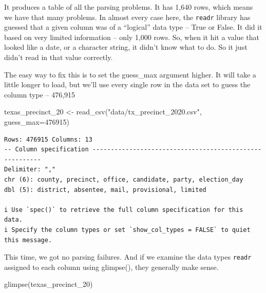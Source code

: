 \documentclass[
  letterpaper,
  DIV=11,
  numbers=noendperiod]{scrreprt}
\newenvironment{Shaded}{\begin{snugshade}}{\end{snugshade}}
\newcommand{\AttributeTok}[1]{\textcolor[rgb]{0.40,0.45,0.13}{#1}}
\newcommand{\DecValTok}[1]{\textcolor[rgb]{0.68,0.00,0.00}{#1}}
\newcommand{\FunctionTok}[1]{\textcolor[rgb]{0.28,0.35,0.67}{#1}}
\newcommand{\NormalTok}[1]{\textcolor[rgb]{0.00,0.23,0.31}{#1}}
\newcommand{\OtherTok}[1]{\textcolor[rgb]{0.00,0.23,0.31}{#1}}
\newcommand{\StringTok}[1]{\textcolor[rgb]{0.13,0.47,0.30}{#1}}
\begin{document}
It produces a table of all the parsing problems. It has 1,640 rows,
which means we have that many problems. In almost every case here, the
\texttt{readr} library has guessed that a given column was of a
``logical'' data type -- True or False. It did it based on very limited
information -- only 1,000 rows. So, when it hit a value that looked like
a date, or a character string, it didn't know what to do. So it just
didn't read in that value correctly.

The easy way to fix this is to set the guess\_max argument higher. It
will take a little longer to load, but we'll use every single row in the
data set to guess the column type -- 476,915

\begin{Shaded}
\begin{Highlighting}[]
\NormalTok{texas\_precinct\_20 }\OtherTok{\textless{}{-}} \FunctionTok{read\_csv}\NormalTok{(}\StringTok{"data/tx\_precinct\_2020.csv"}\NormalTok{, }\AttributeTok{guess\_max=}\DecValTok{476915}\NormalTok{)}
\end{Highlighting}
\end{Shaded}

\begin{verbatim}
Rows: 476915 Columns: 13
-- Column specification --------------------------------------------------------
Delimiter: ","
chr (6): county, precinct, office, candidate, party, election_day
dbl (5): district, absentee, mail, provisional, limited

i Use `spec()` to retrieve the full column specification for this data.
i Specify the column types or set `show_col_types = FALSE` to quiet this message.
\end{verbatim}

This time, we got no parsing failures. And if we examine the data types
\texttt{readr} assigned to each column using glimpse(), they generally
make sense.

\begin{Shaded}
\begin{Highlighting}[]
\FunctionTok{glimpse}\NormalTok{(texas\_precinct\_20)}
\end{Highlighting}
\end{Shaded}
\end{document}
